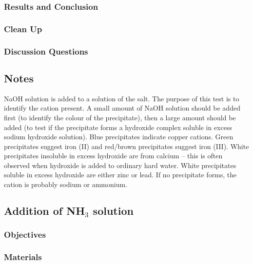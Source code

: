 \subsubsection{Results and Conclusion}


\subsubsection{Clean Up}
\begin{enumerate}
\end{enumerate}


\subsubsection{Discussion Questions}
\begin{enumerate}
\end{enumerate}

\subsection{Notes}

NaOH solution is added to a solution of the salt. 
The purpose of this test is to identify the cation present. 
A small amount of NaOH solution should be added first 
(to identify the colour of the precipitate), 
then a large amount should be added (to test if the precipitate 
forms a hydroxide complex soluble in excess sodium hydroxide solution). 
Blue precipitates indicate copper cations. 
Green precipitates suggest iron (II) 
and red/brown precipitates suggest iron (III). 
White precipitates insoluble in excess hydroxide are from calcium – 
this is often observed when hydroxide is added to ordinary hard water. 
White precipitates soluble in excess hydroxide are either zinc or lead. 
If no precipitate forms, 
the cation is probably sodium or ammonium.


\subsection{Addition of NH$_{3}$ solution}

\subsubsection{Objectives}


\subsubsection{Materials}



